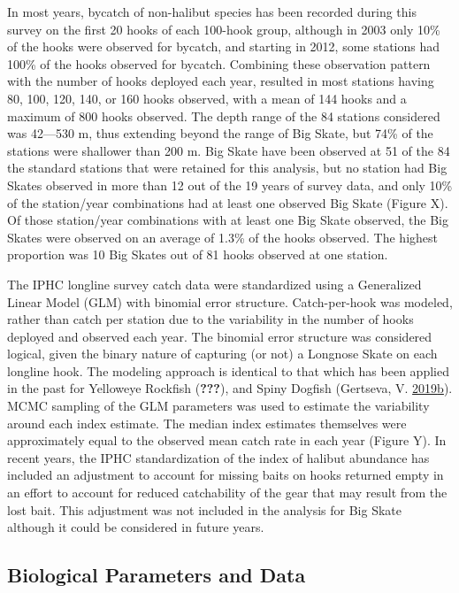\documentclass[12pt,]{article}
\begin{document}
In most years, bycatch of non-halibut species has been recorded during
this survey on the first 20 hooks of each 100-hook group, although in
2003 only 10\% of the hooks were observed for bycatch, and starting in
2012, some stations had 100\% of the hooks observed for bycatch.
Combining these observation pattern with the number of hooks deployed
each year, resulted in most stations having 80, 100, 120, 140, or 160
hooks observed, with a mean of 144 hooks and a maximum of 800 hooks
observed. The depth range of the 84 stations considered was 42---530 m,
thus extending beyond the range of Big Skate, but 74\% of the stations
were shallower than 200 m. Big Skate have been observed at 51 of the 84
the standard stations that were retained for this analysis, but no
station had Big Skates observed in more than 12 out of the 19 years of
survey data, and only 10\% of the station/year combinations had at least
one observed Big Skate (Figure X). Of those station/year combinations
with at least one Big Skate observed, the Big Skates were observed on an
average of 1.3\% of the hooks observed. The highest proportion was 10
Big Skates out of 81 hooks observed at one station.

The IPHC longline survey catch data were standardized using a
Generalized Linear Model (GLM) with binomial error structure.
Catch-per-hook was modeled, rather than catch per station due to the
variability in the number of hooks deployed and observed each year. The
binomial error structure was considered logical, given the binary nature
of capturing (or not) a Longnose Skate on each longline hook. The
modeling approach is identical to that which has been applied in the
past for Yelloweye Rockfish ({\textbf{???}}), and Spiny Dogfish
(Gertseva, V.
\protect\hyperlink{ref-Gertseva2011}{2019}\protect\hyperlink{ref-Gertseva2011}{b}).
MCMC sampling of the GLM parameters was used to estimate the variability
around each index estimate. The median index estimates themselves were
approximately equal to the observed mean catch rate in each year (Figure
Y). In recent years, the IPHC standardization of the index of halibut
abundance has included an adjustment to account for missing baits on
hooks returned empty in an effort to account for reduced catchability of
the gear that may result from the lost bait. This adjustment was not
included in the analysis for Big Skate although it could be considered
in future years. \newpage

\hypertarget{biological-parameters-and-data}{%
\subsection{Biological Parameters and
Data}\label{biological-parameters-and-data}}
\end{document}
